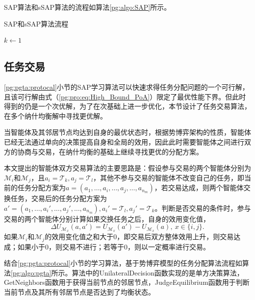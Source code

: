 SAP算法和sSAP算法的流程如算法\ref{pg:algo:SAP}所示。

\begin{algorithm}[htb]
	\caption{SAP和sSAP算法流程}
	\label{pg:algo:SAP}
	\small
	\SetAlgoLined
	$k \gets 1$\;
\end{algorithm}

\subsection{任务交易}
\label{pg:pgta:selection}
\ref{pg:pgta:protocal}小节的SAP学习算法可以快速求得任务分配问题的一个可行解，且该可行解由式（\ref{pg:pro:eq:High_Bound_PoA}）限定了最优性能下界。但此时得到的仍是一个次优解，为了在次基础上进一步优化，本节设计了任务交易算法，在多个纳什均衡解中寻找更优解。

当智能体及其邻居节点均达到自身的最优状态时，根据势博弈架构的性质，智能体已经无法通过单向的决策提高自身和全局的效用，因此此时需要智能体之间进行双方的协商与交易，在纳什均衡的基础上继续寻找更优的分配方案。

本文提出的智能体双方交易算法的主要思路是：假设参与交易的两个智能体分别为$\mathcal{M}_i$和$\mathcal{M}_j$，且$a_i=\mathcal{T}_k,a_j=\mathcal{T}_l$，其他不参与交易的智能体不改变自己的任务，即当前的任务分配方案为$a=(a_1,\dots,a_i,\dots,a_j,\dots,a_{n_m})$，若交易达成，则两个智能体交换任务，交易后的任务分配方案为$a'=(a_1,\dots,a_i',\dots,a_j',\dots,a_{n_m}),a_i'=\mathcal{T}_l,a_j'=\mathcal{T}_k$。判断是否交易的条件时，参与交易的两个智能体分别计算如果交换任务之后，自身的效用变化值，
\begin{equation}
\label{pg:eq:deltaU}
	\Delta U_{\mathcal{M}_x}(a,a') = U_{\mathcal{M}_x}(a') - U_{\mathcal{M}_x}(a),\ x \in \{i,j\}.
\end{equation}
如果$\mathcal{M}_i$和$\mathcal{M}_j$的效用变化值之和大于0，即交易后双方整体效用上升，则交易达成；如果小于0，则交易不进行；若等于0，则以一定概率进行交易。

结合\ref{pg:pgta:protocal}小节的学习算法，基于势博弈模型的任务分配算法流程如算法\ref{pg:algo:pgta}所示。算法中的UnilateralDecision函数实现的是单方决策算法，GetNeighbors函数用于获得当前节点的邻居节点，JudgeEquilibrium函数用于判断当前节点及其所有邻居节点是否达到了均衡状态。

